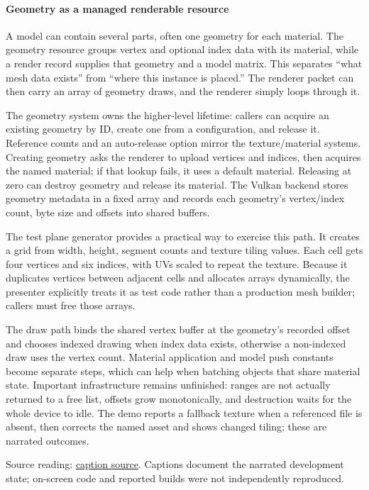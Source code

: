 \paragraph{Geometry as a managed renderable resource}\label{geometry-as-a-managed-renderable-resource}

A model can contain several parts, often one geometry for each material. The geometry resource groups vertex and optional index data with its material, while a render record supplies that geometry and a model matrix. This separates ``what mesh data exists'' from ``where this instance is placed.'' The renderer packet can then carry an array of geometry draws, and the renderer simply loops through it.

The geometry system owns the higher-level lifetime: callers can acquire an existing geometry by ID, create one from a configuration, and release it. Reference counts and an auto-release option mirror the texture/material systems. Creating geometry asks the renderer to upload vertices and indices, then acquires the named material; if that lookup fails, it uses a default material. Releasing at zero can destroy geometry and release its material. The Vulkan backend stores geometry metadata in a fixed array and records each geometry's vertex/index count, byte size and offsets into shared buffers.

The test plane generator provides a practical way to exercise this path. It creates a grid from width, height, segment counts and texture tiling values. Each cell gets four vertices and six indices, with UVs scaled to repeat the texture. Because it duplicates vertices between adjacent cells and allocates arrays dynamically, the presenter explicitly treats it as test code rather than a production mesh builder; callers must free those arrays.

The draw path binds the shared vertex buffer at the geometry's recorded offset and chooses indexed drawing when index data exists, otherwise a non-indexed draw uses the vertex count. Material application and model push constants become separate steps, which can help when batching objects that share material state. Important infrastructure remains unfinished: ranges are not actually returned to a free list, offsets grow monotonically, and destruction waits for the whole device to idle. The demo reports a fallback texture when a referenced file is absent, then corrects the named asset and shows changed tiling; these are narrated outcomes.

Source reading: \href{https://www.youtube.com/watch?v=tHW0T6a0h5E}{caption source}. Captions document the narrated development state; on-screen code and reported builds were not independently reproduced.

